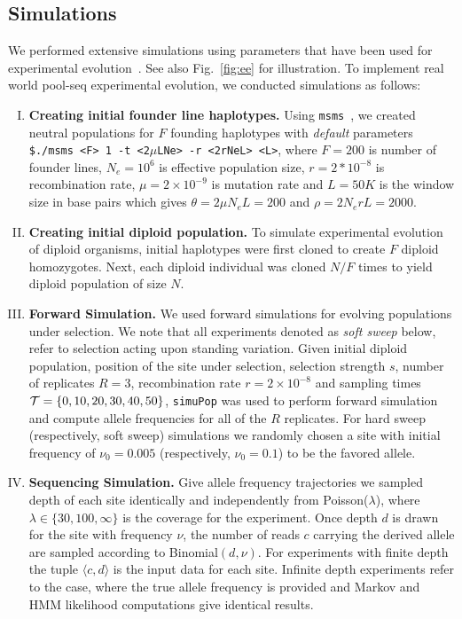 \subsection{Simulations}
We performed extensive simulations using parameters that have been
used for \dmel experimental
evolution~\cite{kofler2013guide}. See also Fig.~\ref{fig:ee} for
illustration. To implement real world pool-seq experimental evolution, we 
conducted simulations as follows:
\begin{enumerate}[I.]
\item {\bf Creating initial founder line haplotypes.} Using
  \texttt{msms}~\cite{ewing2010msms}, we created neutral populations for $F$
  founding haplotypes with \emph{default} parameters \texttt{\$./msms
    <F> 1 -t <2$\mu$LNe> -r <2rNeL> <L>}, where $F=200$ is number of
  founder lines, $N_e=10^6$ is effective population size,
  $r=2*10^{-8}$ is recombination rate, $\mu=2\times 10^{-9}$ is
  mutation rate and $L=50K$ is the window size in base pairs which
  gives $\theta=2\mu N_eL=200$ and $\rho=2N_erL=2000$.
  
\item{\bf Creating initial diploid population.} To simulate
  experimental evolution of diploid organisms, initial haplotypes were
  first cloned to create $F$ diploid homozygotes. Next, each diploid
  individual was cloned $N/F$ times to yield diploid population of
  size $N$.

\item{\bf Forward Simulation.} We used forward simulations for
  evolving populations under selection. We note that all experiments
  denoted as \emph{soft sweep} below, refer to selection acting upon
  standing variation. Given initial diploid population, position of
  the site under selection, selection strength $s$, number of
  replicates $R=3$, recombination rate $r=2\times10^{-8}$ and sampling
  times ${\cal T}=\{0,10,20,30,40,50\}$, \texttt{simuPop} was used to
  perform forward simulation and compute allele frequencies for all of
  the $R$ replicates.  For hard sweep (respectively, soft sweep)
  simulations we randomly chosen a site with initial frequency of
  $\nu_0=0.005$ (respectively, $\nu_0=0.1$) to be the favored allele.
\item{\bf Sequencing Simulation.} Give allele frequency trajectories
  we sampled depth of each site identically and independently from
  Poisson($\lambda$), where $\lambda \in \{30,100,\infty\}$ is the
  coverage for the experiment. Once depth $d$ is drawn for the site
  with frequency $\nu$, the number of reads $c$ carrying the derived
  allele are sampled according to Binomial$(d,\nu)$. For experiments
  with finite depth the tuple $\langle c,d\rangle$ is the input data
  for each site. Infinite depth experiments refer to the case, where
  the true allele frequency is provided and Markov and HMM likelihood
  computations give identical results.
\end{enumerate}
